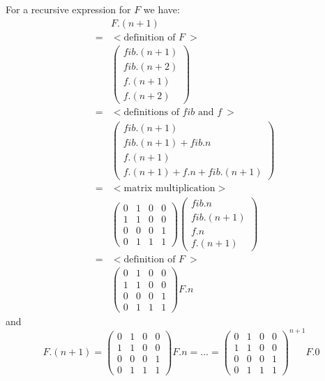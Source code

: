 For a recursive expression for $F$ we have:
\[
\begin{array}{lcl}
  &&F.(n + 1) \\
   &=& { < \text{definition of  } F\ >} \\ 
  &&\begin{pmatrix}
       \mathit{fib}.(n + 1) \\
       \mathit{fib}.(n + 2) \\
       f.(n + 1) \\
       f.(n + 2)
   \end{pmatrix} \\
   &=& { < \text{definitions of  } \mathit{fib} \text{ and } f \ >} \\ 
   &&\begin{pmatrix}
      \mathit{fib}.(n + 1) \\
       \mathit{fib}.(n + 1) + \mathit{fib}.n\\
       f.(n + 1) \\
       f.(n + 1) + f.n + \mathit{fib}.(n + 1)
   \end{pmatrix} \\
   &=& { < \text{matrix multiplication}  >} \\ 
   &&\begin{pmatrix}
       0 & 1 & 0 & 0\\
       1 & 1 & 0 & 0\\
       0 & 0 & 0 & 1\\
       0 & 1 & 1 & 1
   \end{pmatrix} 
   \begin{pmatrix}
         \mathit{fib}.n \\
       \mathit{fib}.(n + 1) \\
       f.n \\
       f.(n + 1)
   \end{pmatrix} \\
   &=& { < \text{definition of  } F\ >} \\ 
   &&\begin{pmatrix}
       0 & 1 & 0 & 0\\
       1 & 1 & 0 & 0\\
       0 & 0 & 0 & 1\\
       0 & 1 & 1 & 1
   \end{pmatrix} F.n
  \end{array}
\]
and
\[
  F.(n + 1) = 
  \begin{pmatrix}
        0 & 1 & 0 & 0\\
       1 & 1 & 0 & 0\\
       0 & 0 & 0 & 1\\
       0 & 1 & 1 & 1
   \end{pmatrix}   F.n = \ldots = 
   \begin{pmatrix}
       0 & 1 & 0 & 0\\
       1 & 1 & 0 & 0\\
       0 & 0 & 0 & 1\\
       0 & 1 & 1 & 1
   \end{pmatrix} ^{n + 1} F.0
\]

